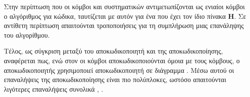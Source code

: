 Στην περίπτωση που οι κόμβοι  και συστηματικών  αντιμετωπίζονται ως ενιαίοι κόμβοι  ο αλγόριθμος  για  κώδικα, ταυτίζεται με αυτόν για ένα  που έχει τον ίδιο πίνακα $\mathbf{H}$. Σε αντίθετη περίπτωση απαιτούνται τροποποιήσεις για τη συμπλήρωση μιας επανάληψης του αλγορίθμου.

Τέλος, ως σύγκριση μεταξύ του  αποκωδικοποιητή και της  αποκωδικοποίησης, αναφέρεται πως, ενώ στον  οι  κόμβοι αποκωδικοποιούνται όμοια με τους  κόμβους, ο  αποκωδικοποιητής χρησιμοποιεί  αποκωδικοποιητή σε διάγραμμα . Μέσω αυτού οι επαναλήψεις της  αποκωδικοποίησης είναι πιο πολύπλοκες, ωστόσο απαιτούνται λιγότερες επαναλήψεις συνολικά \cite{ryan2009channel}, \cite{johnson2009iterative}.
